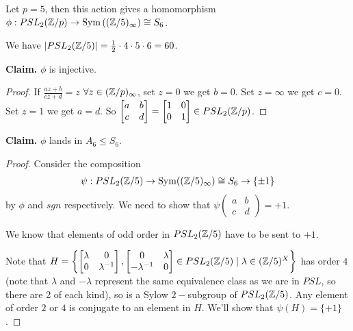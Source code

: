 \documentclass[a4paper]{article}
\begin{document}
\begin{eg}
Let $p=5$, then this action gives a homomorphism $\phi: PSL_2(\mathbb{Z}/p) \to \operatorname{Sym}\left((\mathbb{Z}/5)_\infty\right) \cong S_6$.

We have $|PSL_2(\mathbb{Z}/5)| = \frac{1}{2}\cdot 4\cdot 5 \cdot 6 = 60$.

\textbf{Claim.} $\phi$ is injective.
\begin{proof}
If $\frac{az+b}{cz+d} = z$ $\forall z \in (\mathbb{Z}/p)_\infty$, set $z=0$ we get $b=0$. Set $z=\infty$ we get $c=0$. Set $z=1$ we get $a=d$. So $\left[\begin{matrix}
a & b\\
c & d
\end{matrix}\right] = \left[\begin{matrix}
1 & 0\\
0 & 1
\end{matrix}\right] \in PSL_2 (\mathbb{Z}/p)$.
\end{proof}

\textbf{Claim.} $\phi$ lands in $A_6 \leq S_6$.
\begin{proof}
Consider the composition
\begin{equation*}
\begin{aligned}
\psi: PSL_2(\mathbb{Z}/5) \to \operatorname{Sym}((\mathbb{Z}/5)_\infty) \cong S_6 \to \{\pm 1\} 
\end{aligned}
\end{equation*}
by $\phi$ and $sgn$ respectively. We need to show that $\psi\left(\begin{matrix}
a & b\\
c & d
\end{matrix}\right) = +1$.

We know that elements of odd order in $PSL_2(\mathbb{Z}/5)$ have to be sent to $+1$.

Note that $H = \left\{ \left[\begin{matrix}
\lambda & 0\\
0 & \lambda^{-1} 
\end{matrix}\right], \left[\begin{matrix}
0 & \lambda\\
-\lambda^{-1} & 0
\end{matrix}\right] \in PSL_2(\mathbb{Z}/5) \mid \lambda \in (\mathbb{Z}/5)^X \right\}$ has order $4$ (note that $\lambda$ and $-\lambda$ represent the same equivalence class as we are in $PSL$, so there are 2 of each kind), so is a Sylow $2-$subgroup of $PSL_2(\mathbb{Z}/5)$. Any element of order $2$ or $4$ is conjugate to an element in $H$. We'll show that $\psi(H) = \{+1\}$.


\end{proof}
\end{eg}
\end{document}

